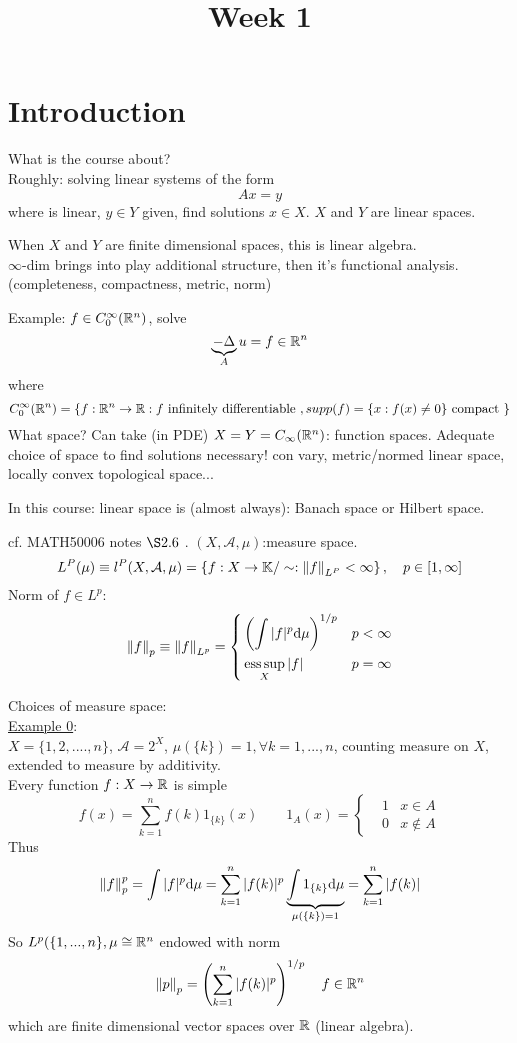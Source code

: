 \documentclass{article}
\title{Week 1}
\author{\aut}
\begin{document}
\maketitle
\section{Introduction}  

What is the course about?\\

Roughly: solving linear systems of the form
$$Ax=y$$
where  is linear, $y\in Y$ given, find solutions $x\in X$. $X$ and $Y$ are linear spaces.
\begin{remark}
	When $X$ and $Y$ are finite dimensional spaces, this is linear algebra.\\
	$\infty$-dim brings into play additional structure, then it's functional analysis. (completeness, compactness, metric, norm)
\end{remark}

Example: $f\in C_0^\infty (\mathbb{R}^n)$, solve
$$
	\underbrace{-\Delta}_A u=f\in\mathbb{R}^n
$$where
$$
	C_0^\infty(\mathbb{R}^n)=\left\{
	f:\mathbb{R}^n\to\mathbb{R}:f\text{ infinitely differentiable }, supp(f)=\{x:f(x)\neq0\} \text{ compact }
	\right\}
$$
What space?
Can take (in PDE) $X=Y=C_\infty(\mathbb{R}^n)$: function spaces.
Adequate choice of space to find solutions necessary!
con vary, metric/normed linear space, locally convex topological space...

In this course: linear space is (almost always): Banach space or Hilbert space.
\begin{example}
	cf. MATH50006 notes $\S2.6$ .
	$(X,\mathcal{A},\mu)$:measure space.
	$$
		L^P(\mu)\equiv l^P(X,\mathcal{A},\mu)=
		\left\{
		f:X\to\mathbb{K}/\sim:\left\|{f}\right\|_{L^P}<\infty
		\right\},\quad p\in[1,\infty]
	$$
	Norm of $f\in L^p$:
	$$
		\left\|{f}\right\|_p\equiv\left\|{f}\right\|_{L^p}=
		\left\{
		\begin{aligned}
			 & \left(\int|f|^p{\rm d}\mu\right)^{1/p} & p<
			\infty                                               \\
			 & \operatorname*{ess\,sup}_X |f|                          & p=\infty
		\end{aligned}\right.
	$$
\end{example}


Choices of measure space:\\
\underline{Example 0}:\\ $X=\{1,2,....,n\}$, $\mathcal{A}=2^X$, $\mu(\{k\})=1, \forall k=1,...,n$, counting measure on $X$, extended to measure by additivity.\\
Every function $f:X\to\mathbb{R}$ is simple
$$
	f(x)=\sum^n_{k=1}f(k)1_{\{k\}}(x)\qquad 1_A(x)=
	\left\{\begin{aligned}
		 & 1 & x\in A    \\
		 & 0 & x\notin A
	\end{aligned}\right.
$$
Thus
$$
	\left\|{f}\right\|_p^p=\int|f|^p{\rm d}\mu=\sum_{k=1}^n|f(k)|^p
	\underbrace{\int1_{\{k\}}{\rm d}\mu}_{\mu(\{k\})=1}
	=\sum_{k=1}^n|f(k)|
$$
So $L^p(\{1,...,n\},\mu\cong\mathbb{R}^n$ endowed with norm
$$
	\left\|{p}\right\|_p=\left(\sum_{k=1}^n|f(k)|^p\right)^{1/p}\quad f\in\mathbb{R}^n
$$
which are finite dimensional vector spaces over $\mathbb{R}$ (linear algebra).
\end{document}
